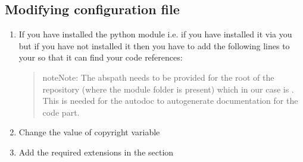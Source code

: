 \documentclass[letterpaper,10pt,english]{sphinxmanual}
\begin{document}
\subsection{Modifying configuration file}
\label{\detokenize{usage:modifying-configuration-file}}\begin{enumerate}
%
\item {} 
\sphinxAtStartPar
If you have installed the python module i.e. if you have installed it via  you  but
if you have not installed it then you have to add the following lines to your  so that it can find your code references:
\begin{quote}

\begin{sphinxVerbatim}[commandchars=\\\{\}]
 
 
 
\end{sphinxVerbatim}

\begin{sphinxadmonition}{note}{Note:}
\sphinxAtStartPar
The abspath needs to be provided for the root of the repository (where the module folder is present) which in our case is .
This is needed for the autodoc to auto\sphinxhyphen{}generate documentation for the code part.
\end{sphinxadmonition}
\end{quote}

\item {} 
\sphinxAtStartPar
Change the value of copyright variable
\begin{quote}

\begin{sphinxVerbatim}[commandchars=\\\{\}]
  
\end{sphinxVerbatim}
\end{quote}

\item {} 
\sphinxAtStartPar
Add the required extensions in the  section
\begin{quote}


\end{quote}
\end{enumerate}
\end{document}
